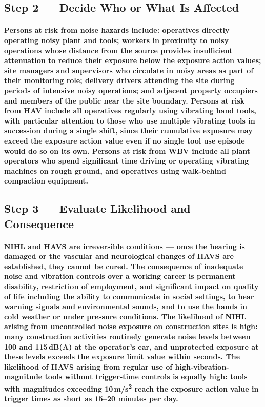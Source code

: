 \subsection{Step 2 --- Decide Who or What Is Affected}
\paragraph{Persons at risk from noise hazards include: operatives directly operating noisy plant and tools; workers in proximity to noisy operations whose distance from the source provides insufficient attenuation to reduce their exposure below the exposure action values; site managers and supervisors who circulate in noisy areas as part of their monitoring role; delivery drivers attending the site during periods of intensive noisy operations; and adjacent property occupiers and members of the public near the site boundary. Persons at risk from HAV include all operatives regularly using vibrating hand tools, with particular attention to those who use multiple vibrating tools in succession during a single shift, since their cumulative exposure may exceed the exposure action value even if no single tool use episode would do so on its own. Persons at risk from WBV include all plant operators who spend significant time driving or operating vibrating machines on rough ground, and operatives using walk-behind compaction equipment.}

\subsection{Step 3 --- Evaluate Likelihood and Consequence}
\paragraph{NIHL and HAVS are irreversible conditions --- once the hearing is damaged or the vascular and neurological changes of HAVS are established, they cannot be cured. The consequence of inadequate noise and vibration controls over a working career is permanent disability, restriction of employment, and significant impact on quality of life including the ability to communicate in social settings, to hear warning signals and environmental sounds, and to use the hands in cold weather or under pressure conditions. The likelihood of NIHL arising from uncontrolled noise exposure on construction sites is high: many construction activities routinely generate noise levels between 100 and 115\,dB(A) at the operator's ear, and unprotected exposure at these levels exceeds the exposure limit value within seconds. The likelihood of HAVS arising from regular use of high-vibration-magnitude tools without trigger-time controls is equally high: tools with magnitudes exceeding 10\,m/s\textsuperscript{2} reach the exposure action value in trigger times as short as 15--20 minutes per day.}

